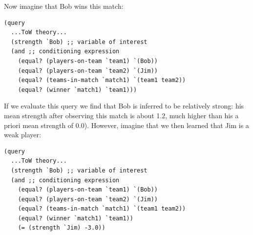 \documentclass[12pt]{article}
\begin{document}
Now imagine that Bob wins this match:
\begin{lstlisting}[mathescape]
(query
  ...ToW theory...
  (strength `Bob) ;; variable of interest 
  (and ;; conditioning expression
    (equal? (players-on-team `team1) `(Bob))
    (equal? (players-on-team `team2) `(Jim))
    (equal? (teams-in-match `match1) `(team1 team2))
    (equal? (winner `match1) `team1)))
\end{lstlisting}
If we evaluate this query we find that Bob is inferred to be relatively strong: his mean strength after observing this match is about 1.2, much higher than his a priori mean strength of $0.0$). 
However, imagine that we then learned that Jim is a weak player:
 \begin{lstlisting}[mathescape]
(query
  ...ToW theory...
  (strength `Bob) ;; variable of interest 
  (and ;; conditioning expression
    (equal? (players-on-team `team1) `(Bob))
    (equal? (players-on-team `team2) `(Jim))
    (equal? (teams-in-match `match1) `(team1 team2))
    (equal? (winner `match1) `team1))
    (= (strength `Jim) -3.0))
\end{lstlisting}
\end{document}
